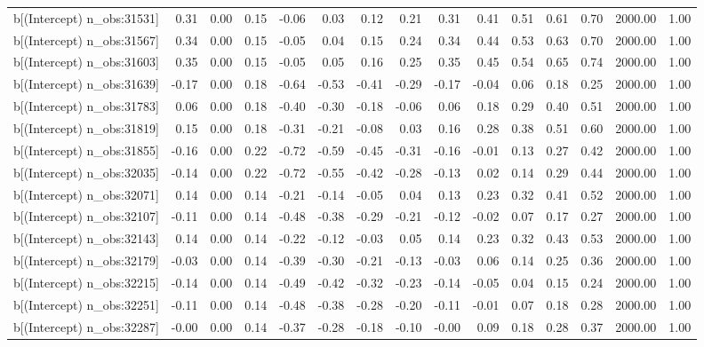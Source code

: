 \begin{table}[ht]
\begin{tabular}{rrrrrrrrrrrrrrr}
  b[(Intercept) n\_obs:31531] & 0.31 & 0.00 & 0.15 & -0.06 & 0.03 & 0.12 & 0.21 & 0.31 & 0.41 & 0.51 & 0.61 & 0.70 & 2000.00 & 1.00 \\ 
  b[(Intercept) n\_obs:31567] & 0.34 & 0.00 & 0.15 & -0.05 & 0.04 & 0.15 & 0.24 & 0.34 & 0.44 & 0.53 & 0.63 & 0.70 & 2000.00 & 1.00 \\ 
  b[(Intercept) n\_obs:31603] & 0.35 & 0.00 & 0.15 & -0.05 & 0.05 & 0.16 & 0.25 & 0.35 & 0.45 & 0.54 & 0.65 & 0.74 & 2000.00 & 1.00 \\ 
  b[(Intercept) n\_obs:31639] & -0.17 & 0.00 & 0.18 & -0.64 & -0.53 & -0.41 & -0.29 & -0.17 & -0.04 & 0.06 & 0.18 & 0.25 & 2000.00 & 1.00 \\ 
  b[(Intercept) n\_obs:31783] & 0.06 & 0.00 & 0.18 & -0.40 & -0.30 & -0.18 & -0.06 & 0.06 & 0.18 & 0.29 & 0.40 & 0.51 & 2000.00 & 1.00 \\ 
  b[(Intercept) n\_obs:31819] & 0.15 & 0.00 & 0.18 & -0.31 & -0.21 & -0.08 & 0.03 & 0.16 & 0.28 & 0.38 & 0.51 & 0.60 & 2000.00 & 1.00 \\ 
  b[(Intercept) n\_obs:31855] & -0.16 & 0.00 & 0.22 & -0.72 & -0.59 & -0.45 & -0.31 & -0.16 & -0.01 & 0.13 & 0.27 & 0.42 & 2000.00 & 1.00 \\ 
  b[(Intercept) n\_obs:32035] & -0.14 & 0.00 & 0.22 & -0.72 & -0.55 & -0.42 & -0.28 & -0.13 & 0.02 & 0.14 & 0.29 & 0.44 & 2000.00 & 1.00 \\ 
  b[(Intercept) n\_obs:32071] & 0.14 & 0.00 & 0.14 & -0.21 & -0.14 & -0.05 & 0.04 & 0.13 & 0.23 & 0.32 & 0.41 & 0.52 & 2000.00 & 1.00 \\ 
  b[(Intercept) n\_obs:32107] & -0.11 & 0.00 & 0.14 & -0.48 & -0.38 & -0.29 & -0.21 & -0.12 & -0.02 & 0.07 & 0.17 & 0.27 & 2000.00 & 1.00 \\ 
  b[(Intercept) n\_obs:32143] & 0.14 & 0.00 & 0.14 & -0.22 & -0.12 & -0.03 & 0.05 & 0.14 & 0.23 & 0.32 & 0.43 & 0.53 & 2000.00 & 1.00 \\ 
  b[(Intercept) n\_obs:32179] & -0.03 & 0.00 & 0.14 & -0.39 & -0.30 & -0.21 & -0.13 & -0.03 & 0.06 & 0.14 & 0.25 & 0.36 & 2000.00 & 1.00 \\ 
  b[(Intercept) n\_obs:32215] & -0.14 & 0.00 & 0.14 & -0.49 & -0.42 & -0.32 & -0.23 & -0.14 & -0.05 & 0.04 & 0.15 & 0.24 & 2000.00 & 1.00 \\ 
  b[(Intercept) n\_obs:32251] & -0.11 & 0.00 & 0.14 & -0.48 & -0.38 & -0.28 & -0.20 & -0.11 & -0.01 & 0.07 & 0.18 & 0.28 & 2000.00 & 1.00 \\ 
  b[(Intercept) n\_obs:32287] & -0.00 & 0.00 & 0.14 & -0.37 & -0.28 & -0.18 & -0.10 & -0.00 & 0.09 & 0.18 & 0.28 & 0.37 & 2000.00 & 1.00 \\ 

\end{tabular}
\end{table}
